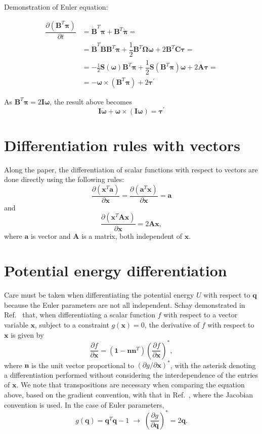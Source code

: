 \documentclass[aip,jcp,reprint,amsmath,amssymb]{revtex4-1}
\newcommand{\mt}[1]{\boldsymbol{\mathbf{#1}}}           %
\newcommand{\vt}[1]{\boldsymbol{\mathbf{#1}}}           %
\newcommand{\tr}[1]{#1^T}                               %
\newcommand{\diff}[2]{\dfrac{\partial #1}{\partial #2}} %
\begin{document}
Demonstration of Euler equation:

\begin{align*}
\diff{(\tr{\mt B}\vt \pi)}{t} &= \tr{\dot{\mt B}}\vt \pi + \tr{\mt B}\dot{\vt \pi} = \\
&=\tr{\dot{\mt B}}{\mt B}\tr{\mt B}{\vt \pi}  + \dfrac{1}{2} \tr{\mt B}\mt \Omega \vt \omega + 2 \tr{\mt B}\mt C \vt \tau = \\
&= -\frac{1}{2}{\mt S}(\vt \omega)\tr{\mt B}{\vt \pi} + \dfrac{1}{2} {\mt S}(\tr{\mt B}\mt \pi) \vt \omega + 2 \mt A \vt \tau = \\
&= - \vt \omega \times (\tr{\mt B}{\vt \pi}) + 2 {\vt \tau}^\prime
\end{align*}

As $\tr{\mt B}\vt \pi = 2 \mt I \vt \omega$, the result above becomes
\[
\mt I \dot{\vt \omega} + \vt \omega \times (\mt I \vt \omega) = {\vt \tau}^\prime
\]

\section{\label{sec:Diff_Rules}Differentiation rules with vectors}

Along the paper, the differentiation of scalar functions with respect to vectors are done directly using the following rules:
\[
\diff{(\tr{\vt x}\vt a)}{\vt x} = \diff{(\tr{\vt a}\vt x)}{\vt x} = \vt a
\]
and
\[
\diff{(\tr{\vt x}\mt A \vt x)}{\vt x} = 2 \mt A \vt x,
\]
where $\vt a$ is vector and $\mt A$ is a matrix, both independent of $\vt x$.

\section{\label{sec:Diff_PotEng}Potential energy differentiation}

Care must be taken when differentiating the potential energy $U$ with respect to $\vt q$ because the Euler parameters are not all independent. Schay demonstrated in Ref.~\cite{Schay1995} that, when differentiating a scalar function $f$ with respect to a vector variable $\vt x$, subject to a constraint $g(\vt x) = 0$, the derivative of $f$ with respect to $\vt x$ is given by
\[
\diff{f}{\vt x} = (\vt 1 - \vt n \tr{\vt n})\left( \diff{f}{\vt x} \right)^\ast,
\]
where $\vt n$ is the unit vector proportional to $(\partial g/\partial \vt x)^\ast$, with the asterisk denoting a differentiation performed without considering the interdependence of the entries of $\vt x$. We note that transpositions are necessary when comparing the equation above, based on the gradient convention, with that in Ref.~\cite{Schay1995}, where the Jacobian convention is used. In the  case of Euler parameters,
\[
g(\vt q) = \tr{\vt q}\vt q - 1 \; \rightarrow \; \left(\diff{g}{\vt q}\right)^\ast = 2 \vt q.
\]
\end{document}
